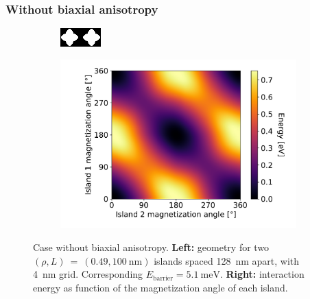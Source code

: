 \documentclass[11pt,a4paper,english]{article}
\begin{document}
\subsubsection{Without biaxial anisotropy}
\begin{figure}[b!]
    \centering
    \begin{subfigure}[c]{4cm} %
         \centering
         \includegraphics[width=\textwidth]{Figures/two_islands/Geometry/geom_r0.49_s100_d128_a0,0_cell4nm.png}
     \end{subfigure}
    \begin{subfigure}[c]{0.6\columnwidth}
         \centering
         \includegraphics[width=\textwidth]{Figures/two_islands/EnergyLandscape/Int_a0Pi,0Pi_d128_r0.49,0.49_cell4nm.pdf}
     \end{subfigure}
    \caption{Case without biaxial anisotropy. \textbf{Left:} geometry for two $(\rho, L)~=~(0.49, \SI{100}{\nano\metre})$ islands spaced \SI{128}{\nano\metre} apart, with \SI{4}{\nano\metre} grid. Corresponding $E_\mathrm{barrier}=\SI{5.1}{\milli\electronvolt}$. \textbf{Right:} interaction energy as function of the magnetization angle of each island.}
    \label{fig:two-islands_interaction_(r0.49_L100)_a0and0}
\end{figure}
\end{document}

